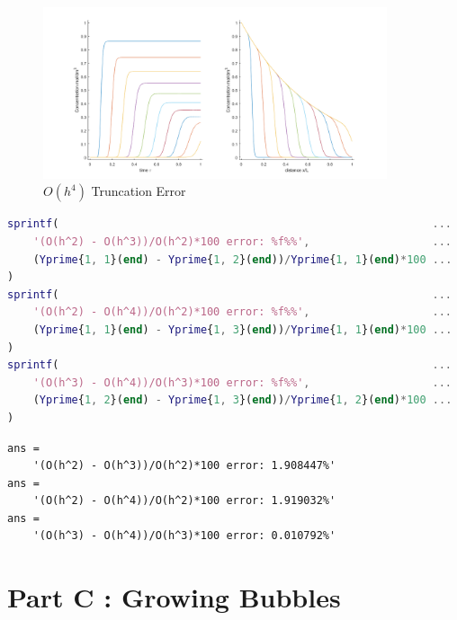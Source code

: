 \documentclass{article}
\begin{document}
\begin{figure}[h!]
	\centering
	\includegraphics[width=0.90\textwidth]{./matlab/Oh4_truncationError.png}
	\caption{$O(h^4)$ Truncation Error}
	\label{img:Oh4TruncationError}
\end{figure}

\begin{lstlisting}[language=Matlab, caption=Reactor : Compute percent error for each implementation, label=lis:reactorComputePercentError]
%% Print error between O(h)s
sprintf(                                                          ...
    '(O(h^2) - O(h^3))/O(h^2)*100 error: %f%%',                   ...
    (Yprime{1, 1}(end) - Yprime{1, 2}(end))/Yprime{1, 1}(end)*100 ...
)
sprintf(                                                          ...
    '(O(h^2) - O(h^4))/O(h^2)*100 error: %f%%',                   ...
    (Yprime{1, 1}(end) - Yprime{1, 3}(end))/Yprime{1, 1}(end)*100 ...
)
sprintf(                                                          ...
    '(O(h^3) - O(h^4))/O(h^3)*100 error: %f%%',                   ...
    (Yprime{1, 2}(end) - Yprime{1, 3}(end))/Yprime{1, 2}(end)*100 ...
)
\end{lstlisting}

\begin{lstlisting}[caption=Reactor : Percent errors for each truncation, label=lis:reactorPercentErrorsForEachTruncation]
ans =
    '(O(h^2) - O(h^3))/O(h^2)*100 error: 1.908447%'
ans =
    '(O(h^2) - O(h^4))/O(h^2)*100 error: 1.919032%'
ans =
    '(O(h^3) - O(h^4))/O(h^3)*100 error: 0.010792%'
\end{lstlisting}


\section{Part C : Growing Bubbles}
\end{document}
